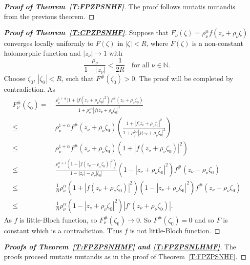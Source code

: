 \documentclass[11pt, reqno]{amsart}
\theoremstyle{definition}
\theoremstyle{remark}
\numberwithin{equation}{section}
\begin{document}
\begin{proof}[{\bf Proof of Theorem~\ref{T:FPZPSNHF}}]
The proof follows mutatis mutandis from the previous theorem. 
\end{proof}
\begin{proof}[{\bf Proof of Theorem~\ref{T:CPZPSNHF}}]
Suppose that 
$
F_{\nu}(\zeta) =\rho_{\nu} ^{\alpha} f(z_{\nu} + \rho_{\nu}  \zeta)
$
converges locally uniformly to $F(\zeta)$ in $|\zeta| < R$, where $F(\zeta)$ is a non-constant holomorphic function and $|z_{\nu}| \to 1$ with 
\begin{equation*}
\frac{\rho_{\nu} }{1 - |z_{\nu}|} < \frac{1}{2R}
\quad \text{for all } \nu \in \mathbb{N}.
\end{equation*}
Choose $\zeta_0$, $|\zeta_0| < R$, such that $F^\#(\zeta_0) > 0$.
The proof will be completed by contradiction.
As 
\begin{align*}
    F_{\nu}^\#(\zeta_0)=&~\frac{\rho_{\nu} ^{1+\alpha}(1+|f(z_{\nu}+\rho_{\nu} \zeta_0|^2)f^\#(z_{\nu}+\rho_{\nu} \zeta_0)}{1+\rho_{\nu} ^{2\alpha}|f(z_{\nu}+\rho_{\nu} \zeta_0|^2}\\
    \le&~\rho_{\nu} ^{1+\alpha}f^\#(z_{\nu}+\rho_{\nu} \zeta_0)\left(\frac{1+|f(z_{\nu}+\rho_{\nu} \zeta_0|^2}{1+\rho_{\nu} ^{2\alpha}|f(z_{\nu}+\rho_{\nu} \zeta_0|^2}\right)\\
    \le&~\rho_{\nu} ^{1+\alpha}f^\#(z_{\nu}+\rho_{\nu} \zeta_0)\left(1+|f(z_{\nu}+\rho_{\nu} \zeta_0)|^2\right)\\
    \le&~ \frac{\rho_{\nu} ^{\alpha+1}\left(1+|f(z_{\nu}+\rho_{\nu} \zeta_0)|^2\right)}{1-|z_{\nu}|-\rho_{\nu} |\zeta_0|}\left(1-|z_{\nu}+\rho_{\nu} \zeta_0|^2 \right)f^\#(z_{\nu}+\rho_{\nu} \zeta_0)\\
    \le&~ \frac{1}{R}\rho_{\nu} ^{\alpha}\left(1+|f(z_{\nu}+\rho_{\nu} \zeta_0)|^2\right)\left(1-|z_{\nu}+\rho_{\nu} \zeta_0|^2 \right)f^\#(z_{\nu}+\rho_{\nu} \zeta_0)\\
    \le&~ \frac{1}{R}\rho_{\nu} ^{\alpha}\left(1-|z_{\nu}+\rho_{\nu} \zeta_0|^2 \right)|f'(z_{\nu}+\rho_{\nu} \zeta_0)|.
\end{align*}
As $f$ is little-Bloch function, so $F_{\nu}^{\#}(\zeta_0)\to 0$. So $F^\#(\zeta_0)=0$ and so $F$ is 
constant which is a contradiction. Thus $f$ is not little-Bloch function.
\end{proof}
\begin{proof}[{\bf Proofs of Theorem~\ref{T:FPZPSNHMF} and \ref{T:FPZPSNLHMF}}]
The proofs proceed mutatis mutandis as in the proof of Theorem~\ref{T:FPZPSNHF}.  
\end{proof}
\end{document}
